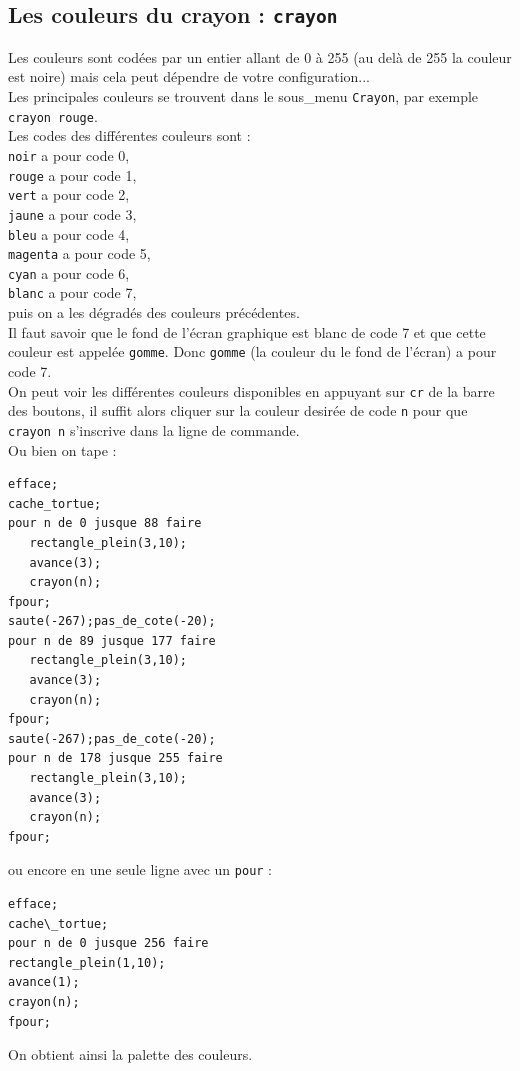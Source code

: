 \documentclass[a4paper,11pt]{book}
\begin{document}
\subsection{Les couleurs du crayon : {\tt crayon}}
Les couleurs sont cod\'ees par un entier allant de 0 \`a 255 (au del\`a de 255 
la couleur est noire) mais cela peut d\'ependre de votre configuration...\\
Les principales couleurs se trouvent dans le sous\_menu {\tt Crayon},
  par exemple {\tt crayon rouge}.\\
Les codes des diff\'erentes couleurs sont :\\
{\tt noir} a pour code 0,\\
{\tt rouge} a pour code 1,\\
{\tt vert} a pour code 2,\\
{\tt jaune} a pour code 3,\\
{\tt bleu} a pour code 4,\\
{\tt magenta} a pour code 5,\\
{\tt cyan} a pour code 6,\\
{\tt blanc} a pour code 7,\\
puis on a les d\'egrad\'es des couleurs pr\'ec\'edentes.\\
Il faut savoir que le fond de l'\'ecran graphique est blanc de code 7 et que
cette couleur est appel\'ee {\tt gomme}. Donc {\tt gomme} (la couleur du le
 fond de l'\'ecran) a pour code 7.\\
On peut voir les diff\'erentes couleurs disponibles en appuyant sur {\tt cr} de
la barre des boutons, il suffit alors cliquer sur la couleur desir\'ee de code 
{\tt n} pour que {\tt crayon n} s'inscrive dans la ligne de commande.\\
Ou bien on tape :
\begin{verbatim}
efface;
cache_tortue;
pour n de 0 jusque 88 faire 
   rectangle_plein(3,10);
   avance(3);
   crayon(n);
fpour;
saute(-267);pas_de_cote(-20);
pour n de 89 jusque 177 faire 
   rectangle_plein(3,10);
   avance(3);
   crayon(n);
fpour;
saute(-267);pas_de_cote(-20);
pour n de 178 jusque 255 faire 
   rectangle_plein(3,10);
   avance(3);
   crayon(n);
fpour;
\end{verbatim}
ou encore en une seule ligne avec un {\tt pour} :\\
\begin{verbatim}
efface;
cache\_tortue;
pour n de 0 jusque 256 faire 
rectangle_plein(1,10);
avance(1);
crayon(n);
fpour;
\end{verbatim}
On obtient ainsi la palette des couleurs.
\end{document}
